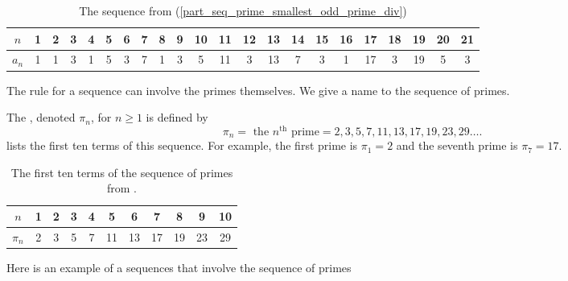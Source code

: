 \begin{exam}
\begin{apart}
            \begin{table}[hbtp]
                \centering
                \begin{tabular}{c| c|c|c|c|c| c|c|c|c|c| c|c|c|c|c| c|c|c|c|c| c}
                     $n$ & 1 & 2 & 3 & 4 & 5 & 6 & 7 & 8 & 9 & 10 & 11 & 12 & 13 & 14 & 15 & 16 & 17 & 18 & 19 & 20 & 21\\ \hline
                     $a_n$ & 1 &  1 &  3 &  1 &  5 &  3 &  7 &  1 &  3 &  5 &  11 &  3 &  13 &  7 &  3 &  1 &  17 &  3 &  19 &  5 & 3
                \end{tabular}
                \caption{The sequence from  (\ref{part_seq_prime_smallest_odd_prime_div}) }
                \label{table_seq_prime_smallest_odd_prime_div}
            \end{table}
    \end{apart}
\end{exam}

The rule for a sequence can involve the primes themselves. We give a name to the sequence of primes.

\begin{defn}
\label{defn_seq_primes}
    The , denoted $\pi_n$, for $n \ge 1$ is defined by $$\pi_n= \text{ the } n^{\text{th}} \text{ prime}= 2, 3, 5, 7, 11, 13, 17, 19, 23, 29 \ldots.$$
     lists the first ten terms of this sequence. For example, the first prime is $\pi_1=2$ and the seventh prime is $\pi_7=17$.  
\end{defn}

\begin{table}[hbtp]
    \centering
    \begin{tabular}{c| c|c|c|c|c | c|c|c|c|c}
        $n$ & 1 & 2 & 3 & 4 & 5 & 6 & 7 & 8 & 9 & 10  \\ \hline
        $\pi_n$ & 2 &  3 &  5 &  7 &  11 &  13 &  17 &  19 &  23 & 29
    \end{tabular}
    \caption{The first ten terms of the sequence of primes from .}
    \label{table_prime_seq}
\end{table}

Here is an example of a sequences that involve the sequence of primes

